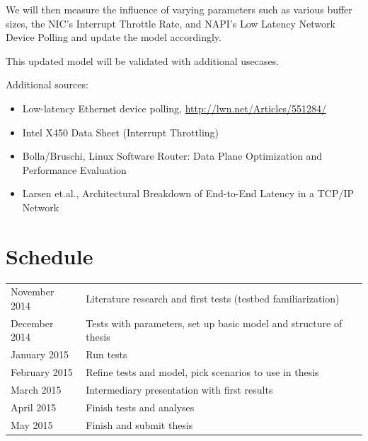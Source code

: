 \documentclass[a4paper]{article}
\begin{document}
We will then measure the influence of varying parameters such as various buffer sizes, the NIC's Interrupt Throttle Rate, and NAPI's Low Latency Network Device Polling and update the model accordingly.

This updated model will be validated with additional usecases.

\vspace{1em}
Additional sources:
\begin{itemize}
  \item Low-latency Ethernet device polling, \url{http://lwn.net/Articles/551284/}
  \item Intel X450 Data Sheet (Interrupt Throttling)
  \item Bolla/Bruschi, Linux Software Router: Data Plane Optimization and Performance Evaluation
  \item Larsen et.al., Architectural Breakdown of End-to-End Latency in a TCP/IP Network
\end{itemize}


\section*{Schedule}

\begin{tabular}{ll}
  November 2014 & Literature research and first tests (testbed familiarization)\\
  December 2014 & Tests with parameters, set up basic model and structure of thesis\\
  January 2015  & Run tests\\
  February 2015 & Refine tests and model, pick scenarios to use in thesis\\
  March 2015    & Intermediary presentation with first results\\
  April 2015    & Finish tests and analyses\\
  May 2015      & Finish and submit thesis\\
\end{tabular}
\end{document}
